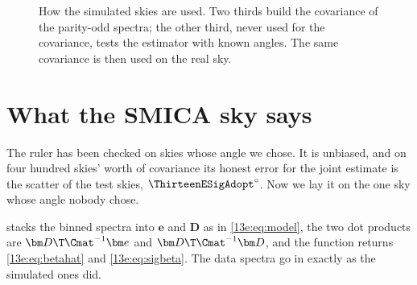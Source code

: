 \begin{figure}[htbp]
\centering
{}
\caption{How the simulated skies are used. Two thirds build the covariance of the parity-odd spectra; the
other third, never used for the covariance, tests the estimator with known angles. The same covariance is
then used on the real sky.}
\label{13e:fig:split}
\end{figure}
\section{What the SMICA sky says}
\label{13e:sec:result}

The ruler has been checked on skies whose angle we chose. It is unbiased, and on four hundred skies'
worth of covariance its honest error for the joint estimate is the scatter of the test skies,
$\ThirteenESigAdopt^\circ$. Now we lay it on the one sky whose angle nobody chose.


\noindent {} stacks the binned spectra into $\bm e$ and $\bm D$ as in \eqref{13e:eq:model}, the two
dot products are $\bm D\T\Cmat^{-1}\bm e$ and $\bm D\T\Cmat^{-1}\bm D$, and the function returns
\eqref{13e:eq:betahat} and \eqref{13e:eq:sigbeta}. The data spectra go in exactly as the simulated ones did.

